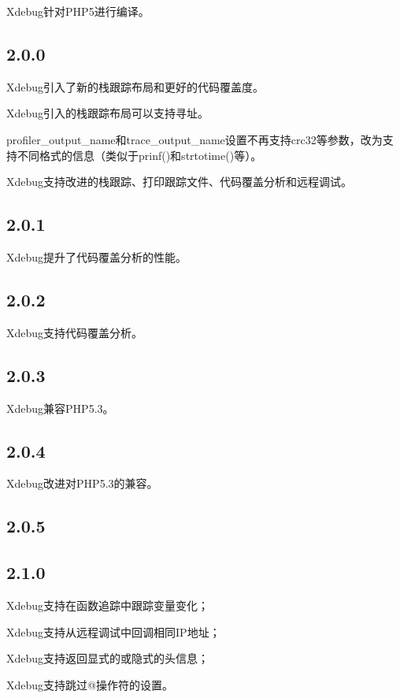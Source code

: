 Xdebug针对PHP5进行编译。

\subsection{2.0.0}

\begin{compactitem}
\item Xdebug引入了新的栈跟踪布局和更好的代码覆盖度。
\item Xdebug引入的栈跟踪布局可以支持寻址。
\item profiler\_output\_name和trace\_output\_name设置不再支持crc32等参数，改为支持不同格式的信息（类似于prinf()和strtotime()等）。
\item Xdebug支持改进的栈跟踪、打印跟踪文件、代码覆盖分析和远程调试。
\end{compactitem}



\subsection{2.0.1}

Xdebug提升了代码覆盖分析的性能。

\subsection{2.0.2}


Xdebug支持代码覆盖分析。

\subsection{2.0.3}

Xdebug兼容PHP5.3。

\subsection{2.0.4}


Xdebug改进对PHP5.3的兼容。



\subsection{2.0.5}

\subsection{2.1.0}

\begin{compactitem}
\item Xdebug支持在函数追踪中跟踪变量变化；
\item Xdebug支持从远程调试中回调相同IP地址；
\item Xdebug支持返回显式的或隐式的头信息；
\item Xdebug支持跳过@操作符的设置。
\end{compactitem}


